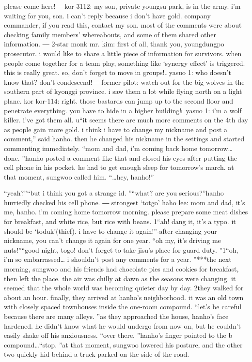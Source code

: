  please come here!― kor-3112: my son, private youngsu park, is in the army.
 i’m waiting for you, son.
 i can’t reply because i don’t have gold.
 company commander, if you read this, contact my son.
most of the comments were about checking family members’ whereabouts, and some of them shared other information.
― 2-star monk mr.
 kim: first of all, thank you, youngdungpo prosecutor.
 i would like to share a little piece of information for survivors.
 when people come together for a team play, something like ‘synergy effect’ is triggered.
 this is really great.
 so, don’t forget to move in groups!˪ yasuo 1: who doesn’t know that? don’t condescend!― former pilot: watch out for the big wolves in the southern part of kyonggi province.
 i saw them a lot while flying north on a light plane.
kor kor-114: right.
 those bastards can jump up to the second floor and penetrate everything.
 you have to hide in a higher building!˪ yasuo 1: i’m a wolf killer.
 i’ve got them all.
 ^^5“it seems there are much more comments on the 4th day as people gain more gold.
 i think i have to change my nickname and post a comment,” said hanho.
 then he changed his nickname in the settings and started commenting immediately.
“mom and dad, i’m coming back home tomorrow…done.
”hanho posted a comment like that and closed his eyes after putting the cell phone in his pocket.
 he had to get enough sleep for tomorrow’s march.
at that moment, sungwoo called him.
“…hey, hanho!”

“yeah?”“but i think you got a strange id.
”“what? are you serious?”hanho hurriedly checked his cell phone.
― strongest ‘totgo’ haho lee: mom and dad, it’s me, hanho.
 i’m coming home tomorrow morning.
 please prepare some meat dishes for breakfast, and white rice, but rice with beans.
1“ah! dang it, it’s a typo.
 it should be ‘toduk'(thief).
 i have to change it again!”-after changing your nickname, you can’t change it again for one year.
“oh my, it’s driving me nuts!”“good night, togo! don’t forget to take jisu’s place for guard duty.
”1“oh, i’m so embarrassed… i shouldn’t post any comments for a year.
”***the next morning, sungwoo and his friends had chocolate pies and cookies for breakfast, then left the place.
 the air was chilly at dawn as the seasons were changing.
 it seemed that the whole world was becoming quieter day by day.
2they walked for about an hour.
 finally, they arrived at hanho’s neighborhood.
 it was an old town with closely spaced townhouses inside the one-room compound.
“let’s be careful because there are many alleys.
”as they approached the house, hanho’s face hardened.
 he didn’t know what he would undergo from now on, but he couldn’t easily shake off his anxiousness.
“over there.
”hanho’s finger pointed to the b compound…“stop.
”at that moment, sungwoo lowered his posture, and the other two quickly hid behind a truck parked on the side of the road.


 